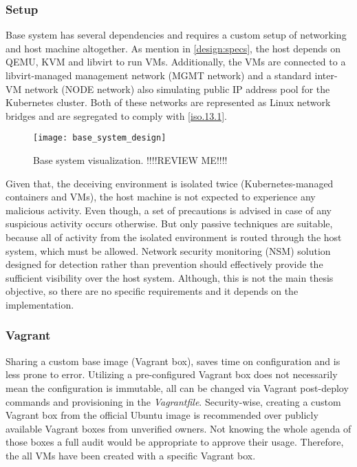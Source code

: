 \subsubsection*{Setup \label{design:env-arch:base:setup}}
Base system has several dependencies and requires a custom setup of networking and host machine altogether. As mention in \autoref{design:specs}, the host depends on QEMU, KVM and libvirt to run VMs. Additionally, the VMs are connected to a libvirt-managed management network (MGMT network) and a standard inter-VM network (NODE network) also simulating public IP address pool for the Kubernetes cluster. Both of these networks are represented as Linux network bridges and are segregated to comply with \ref{iso.13.1}.

\begin{figure}[h]
	\centering
	\texttt{[image: base\_system\_design]}
	\caption{Base system visualization. !!!!REVIEW ME!!!!}
	\label{image:design:base_system}
\end{figure}

Given that, the deceiving environment is isolated twice (Kubernetes-managed containers and VMs), the host machine is not expected to experience any malicious activity. Even though, a set of precautions is advised in case of any suspicious activity occurs otherwise. But only passive techniques are suitable, because all of activity from the isolated environment is routed through the host system, which must be allowed. Network security monitoring (NSM) solution designed for detection rather than prevention should effectively provide the sufficient visibility over the host system. Although, this is not the main thesis objective, so there are no specific requirements and it depends on the implementation.

\subsubsection*{Vagrant \label{design:env-arch:base:vagrant}}
Sharing a custom base image (Vagrant box), saves time on configuration and is less prone to error. Utilizing a pre-configured Vagrant box does not necessarily mean the configuration is immutable, all can be changed via Vagrant post-deploy commands and provisioning in the \textit{Vagrantfile}. Security-wise, creating a custom Vagrant box from the official Ubuntu image is recommended over publicly available Vagrant boxes from unverified owners. Not knowing the whole agenda of those boxes a full audit would be appropriate to approve their usage. Therefore, the all VMs have been created with a specific Vagrant box.

